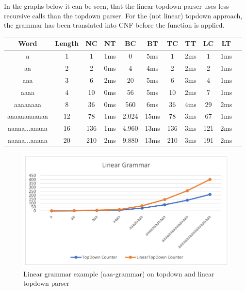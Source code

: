 \documentclass[a4paper, 11pt]{article}
\begin{document}
In the graphs below it can be seen, that the linear topdown parser uses less recursive calls than the topdown parser. For the (not linear) topdown approach, the grammar has been translated into CNF before the function is applied.

\begin{center}
\begin{tabular}{|c|c||c|c||c|c||c|c||c|c|c|}
\hline
Word & Length & NC & NT & BC & BT & TC & TT & LC & LT \\
\hline
\hline
a & 1 & 1 & 1ms & 0 & 5ms & 1 & 2ms & 1 & 1ms \\
\hline
aa & 2 & 2 & 0ms & 4 & 4ms & 2 & 2ms & 2 & 1ms \\
\hline
aaa & 3 & 6 & 2ms & 20 & 5ms & 6 & 3ms & 4 & 1ms \\
\hline
aaaa & 4 & 10 & 0ms & 56 & 5ms & 10 & 2ms & 7 & 1ms \\
\hline
aaaaaaaa & 8 & 36 & 0ms & 560 & 6ms & 36 & 4ms & 29 & 2ms \\
\hline
aaaaaaaaaaaa & 12 & 78 & 1ms & 2.024 & 15ms & 78 & 3ms &  67 & 1ms \\
\hline
aaaaa...aaaaa & 16 & 136 & 1ms & 4.960 & 13ms & 136 & 3ms & 121 & 2ms \\
\hline
aaaaa...aaaaa & 20 & 210 & 2ms & 9.880 & 13ms & 210 & 3ms & 191 & 2ms \\
\hline
\end{tabular}
\end{center}

\begin{figure}[H]
\begin{center}
\includegraphics[scale=0.4]{diagrams/LGBTQ.png}
\end{center}
\caption{Linear grammar example (aaa-grammar) on topdown and linear topdown parser}
\end{figure}
\end{document}
